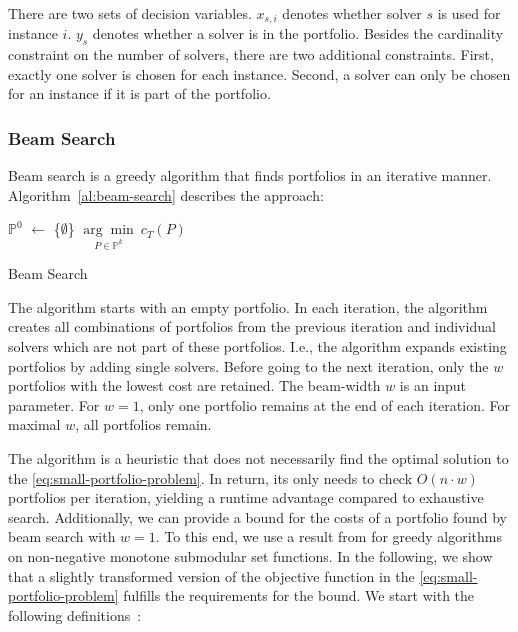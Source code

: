 \documentclass[conference]{IEEEtran}
\begin{document}
There are two sets of decision variables.
$x_{s,i}$ denotes whether solver $s$ is used for instance $i$.
$y_s$ denotes whether a solver is in the portfolio.
Besides the cardinality constraint on the number of solvers, there are two additional constraints.
First, exactly one solver is chosen for each instance.
Second, a solver can only be chosen for an instance if it is part of the portfolio.

\subsubsection{Beam Search}

Beam search is a greedy algorithm that finds portfolios in an iterative manner.
Algorithm~\ref{al:beam-search} describes the approach:

\begin{algorithm}[htb]
	$\mathbb{P}^0$ $\leftarrow$ \{$\emptyset$\}
	\Return $\underset{P \in \mathbb{P}^k}{\arg\min}~c_{T}(P)$\;
	\caption{Beam Search}
	\label{al:beam-search}
\end{algorithm}

The algorithm starts with an empty portfolio.
In each iteration, the algorithm creates all combinations of portfolios from the previous iteration and individual solvers which are not part of these portfolios.
I.e., the algorithm expands existing portfolios by adding single solvers.
Before going to the next iteration, only the $w$ portfolios with the lowest cost are retained.
The beam-width $w$ is an input parameter.
For $w=1$, only one portfolio remains at the end of each iteration.
For maximal $w$, all portfolios remain.

The algorithm is a heuristic that does not necessarily find the optimal solution to the \ref{eq:small-portfolio-problem}.
In return, its only needs to check $O(n \cdot w)$ portfolios per iteration, yielding a runtime advantage compared to exhaustive search.
Additionally, we can provide a bound for the costs of a portfolio found by beam search with $w=1$.
To this end, we use a result from \cite{nemhauser1978analysis} for greedy algorithms on non-negative monotone submodular set functions.
In the following, we show that a slightly transformed version of the objective function in the \ref{eq:small-portfolio-problem} fulfills the requirements for the bound.
We start with the following definitions~\cite{krause2014submodular}:
\end{document}
